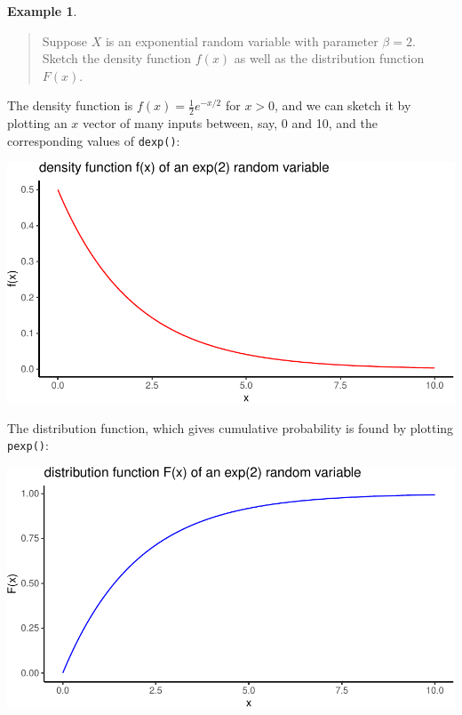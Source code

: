 \documentclass[
]{book}
\theoremstyle{definition}
\theoremstyle{definition}
\newtheorem{example}{Example}[chapter]
\theoremstyle{definition}
\theoremstyle{definition}
\theoremstyle{remark}
\begin{document}
\begin{example}
\protect\hypertarget{exm:sketch-exp-f-and-F}{}\label{exm:sketch-exp-f-and-F}\leavevmode

\begin{quote}
Suppose \(X\) is an exponential random variable with parameter \(\beta = 2\). Sketch the density function \(f(x)\) as well as the distribution function \(F(x)\).
\end{quote}

The density function is \(f(x) = \frac{1}{2}e^{-x/2}\) for \(x > 0\), and we can sketch it by plotting an \(x\) vector of many inputs between, say, 0 and 10, and the corresponding values of \texttt{dexp()}:

\begin{center}\includegraphics{math340-notes_files/figure-latex/unnamed-chunk-179-1} \end{center}

The distribution function, which gives cumulative probability is found by plotting \texttt{pexp()}:

\begin{center}\includegraphics{math340-notes_files/figure-latex/unnamed-chunk-180-1} \end{center}

\end{example}
\end{document}
